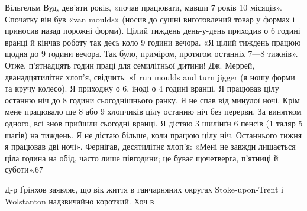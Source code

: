 Вільгельм Вуд, дев’яти років, «почав працювати, мавши
7 років 10 місяців». Спочатку він був «van moulds» (носив до
сушні виготовлений товар у формах і приносив назад порожні
форми). Цілий тиждень день-у-день приходив о 6 годині вранці
й кінчав роботу так десь коло 9 години вечора. «Я цілий тиждень
працюю щодня до 9 години вечора. Так було, приміром, протягом
останніх 7—8 тижнів». Отже, п’ятнадцять годин праці для семилітньої
дитини! Дж. Меррей, дванадцятилітнє хлоп’я, свідчить:
«І run moulds and turn jigger (я ношу форми та кручу колесо).
Я приходжу о 6, іноді о 4 годині вранці. Я працював цілу останню
ніч до 8 години сьогоднішнього ранку. Я не спав від минулої
ночі. Крім мене працювало ще 8 або 9 хлопчиків цілу останню
ніч без перерви. За винятком одного, всі знов прийшли сьогодні
вранці. Я дістаю 3 шилінґи 6 пенсів (1 таляр 5 шагів) на тиждень.
Я не дістаю більше, коли працюю цілу ніч. Останнього тижня
я працював дві ночі». Фернігав, десятилітнє хлоп’я: «Мені не
завжди лишається ціла година на обід, часто лише півгодини;
це буває щочетверга, п’ятниці й суботи».67

Д-р Ґрінхов заявляє, що вік життя в ганчарняних округах
Stoke-upon-Trent і Wolstanton надзвичайно короткий. Хоч в
\parbreak{}  %
